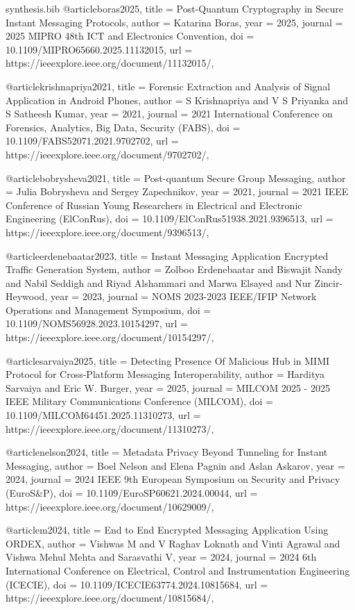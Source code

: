 \begin{filecontents*}{synthesis.bib}
@article{boras2025,
  title = {Post-Quantum Cryptography in Secure Instant Messaging Protocols},
  author = {Katarina Boras},
  year = {2025},
  journal = {2025 MIPRO 48th ICT and Electronics Convention},
  doi = {10.1109/MIPRO65660.2025.11132015},
  url = {https://ieeexplore.ieee.org/document/11132015/},
}

@article{krishnapriya2021,
  title = {Forensic Extraction and Analysis of Signal Application in Android Phones},
  author = {S Krishnapriya and V S Priyanka and S Satheesh Kumar},
  year = {2021},
  journal = {2021 International Conference on Forensics, Analytics, Big Data, Security (FABS)},
  doi = {10.1109/FABS52071.2021.9702702},
  url = {https://ieeexplore.ieee.org/document/9702702/},
}

@article{bobrysheva2021,
  title = {Post-quantum Secure Group Messaging},
  author = {Julia Bobrysheva and Sergey Zapechnikov},
  year = {2021},
  journal = {2021 IEEE Conference of Russian Young Researchers in Electrical and Electronic Engineering (ElConRus)},
  doi = {10.1109/ElConRus51938.2021.9396513},
  url = {https://ieeexplore.ieee.org/document/9396513/},
}

@article{erdenebaatar2023,
  title = {Instant Messaging Application Encrypted Traffic Generation System},
  author = {Zolboo Erdenebaatar and Biswajit Nandy and Nabil Seddigh and Riyad Alshammari and Marwa Elsayed and Nur Zincir-Heywood},
  year = {2023},
  journal = {NOMS 2023-2023 IEEE/IFIP Network Operations and Management Symposium},
  doi = {10.1109/NOMS56928.2023.10154297},
  url = {https://ieeexplore.ieee.org/document/10154297/},
}

@article{sarvaiya2025,
  title = {Detecting Presence Of Malicious Hub in MIMI Protocol for Cross-Platform Messaging Interoperability},
  author = {Harditya Sarvaiya and Eric W. Burger},
  year = {2025},
  journal = {MILCOM 2025 - 2025 IEEE Military Communications Conference (MILCOM)},
  doi = {10.1109/MILCOM64451.2025.11310273},
  url = {https://ieeexplore.ieee.org/document/11310273/},
}

@article{nelson2024,
  title = {Metadata Privacy Beyond Tunneling for Instant Messaging},
  author = {Boel Nelson and Elena Pagnin and Aslan Askarov},
  year = {2024},
  journal = {2024 IEEE 9th European Symposium on Security and Privacy (EuroS\&P)},
  doi = {10.1109/EuroSP60621.2024.00044},
  url = {https://ieeexplore.ieee.org/document/10629009/},
}

@article{m2024,
  title = {End to End Encrypted Messaging Application Using ORDEX},
  author = {Vishwas M and V Raghav Loknath and Vinti Agrawal and Vishwa Mehul Mehta and Sarasvathi V},
  year = {2024},
  journal = {2024 6th International Conference on Electrical, Control and Instrumentation Engineering (ICECIE)},
  doi = {10.1109/ICECIE63774.2024.10815684},
  url = {https://ieeexplore.ieee.org/document/10815684/},
}


\end{filecontents*}
